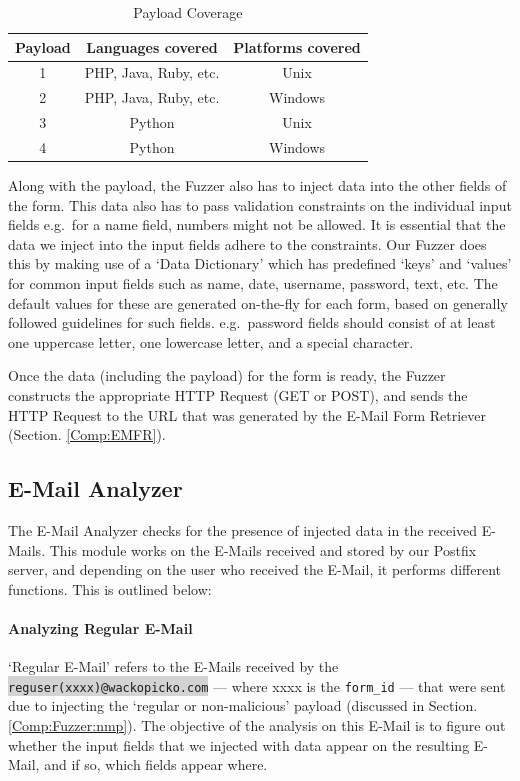 	\begin{table}[!htbp]
		\centering
		\begin{tabular}{|c|c|c|}
			\hline
			Payload & Languages covered & Platforms covered\\
			\hline
			1 & PHP, Java, Ruby, etc. & Unix\\
			\hline
			2 & PHP, Java, Ruby, etc. & Windows\\
			\hline
			3 & Python & Unix\\
			\hline
			4 & Python & Windows\\
			\hline
		\end{tabular}
		\caption{Payload Coverage}
		\label{tab:payloadcov}
	\end{table}
	Along with the payload, the Fuzzer also has to inject data into the other fields of the form. This data also has to pass validation constraints on the individual input fields e.g.\ for a name field, numbers might not be allowed. It is essential that the data we inject into the input fields adhere to the constraints. Our Fuzzer does this by making use of a `Data Dictionary' which has predefined `keys' and `values' for common input fields such as name, date, username, password, text, etc. The default values for these are generated on-the-fly for each form, based on generally followed guidelines for such fields. e.g.\ password fields should consist of at least one uppercase letter, one lowercase letter, and a special character.
	
	Once the data (including the payload) for the form is ready, the Fuzzer constructs the appropriate HTTP Request (GET or POST), and sends the HTTP Request to the URL that was generated by the E-Mail Form Retriever (Section. \ref{Comp:EMFR}). 
	
		
\subsection{E-Mail Analyzer}
	\label{Comp:EMA}
	The E-Mail Analyzer checks for the presence of injected data in the received E-Mails. This module works on the E-Mails received and stored by our Postfix server, and depending on the user who received the E-Mail, it performs different functions. This is outlined below:
	\paragraph{Analyzing Regular E-Mail}
	`Regular E-Mail' refers to the E-Mails received by the \colorbox{lightgray}{\lstinline{reguser(xxxx)@wackopicko.com}} --- where xxxx is the \lstinline{form_id} --- that were sent due to injecting the `regular or non-malicious' payload (discussed in Section. \ref{Comp:Fuzzer:nmp}). The objective of the analysis on this E-Mail is to figure out whether the input fields that we injected with data appear on the resulting E-Mail, and if so, which fields appear where.
	
